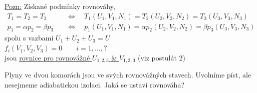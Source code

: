 \textcolor{NavyBlue}{
\underline{Pozn:} Získané podmínky rovnováhy,
\begin{align*}
  T_1 = T_2 = T_3 \quad &\Leftrightarrow\quad T_1(U_1,V_1,N_1) = T_2(U_2,V_2,N_2) = T_3(U_3,V_3,N_3) \\
  p_1 = \alpha p_2 = \beta p_3 \quad &\Leftrightarrow\quad p_1(U_1,V_1,N_1) = \alpha p_2(U_2,V_2,N_2) = \beta p_3(U_3,V_3,N_3)
\end{align*}
spolu s vazbami \quad $U_1 + U_2 + U_3 = U$ \\
\hspace*{3cm} $f_i(V_1,V_2,V_3) = 0 \qquad i = 1,\dots,?$ \\
jsou \underline{rovnice pro rovnovážné $U_{1,2,3}$ \& $V_{1,2,3}$} (viz postulát 2)
}

\begin{priklad}
\begin{center}
\end{center}
Plyny ve dvou komorách jsou ve svých rovnovážných stavech. Uvolníme píst, ale nesejmeme adiabatickou izolaci. Jaká se ustaví rovnováha?
\end{priklad}

